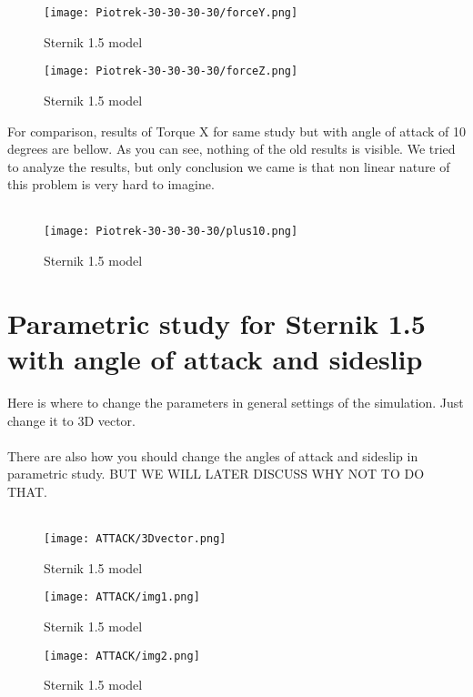 \begin{figure}[H]
    \centering
    \texttt{[image: Piotrek-30-30-30-30/forceY.png]}
    \caption{Sternik 1.5 model}
\end{figure}

\begin{figure}[H]
    \centering
    \texttt{[image: Piotrek-30-30-30-30/forceZ.png]}
    \caption{Sternik 1.5 model}
\end{figure}

For comparison, results of Torque X for same study but with angle of attack of 10 degrees are
bellow. As you can see, nothing of the old results is visible. We tried to analyze the results, but
only conclusion we came is that non linear nature of this problem is very hard to imagine. \\\\

\begin{figure}[H]
    \centering
    \texttt{[image: Piotrek-30-30-30-30/plus10.png]}
    \caption{Sternik 1.5 model}
\end{figure}


\newpage
\section{Parametric study for Sternik 1.5 with angle of attack and sideslip}
Here is where to change the parameters in general settings of the simulation. Just change it 
to 3D vector.\\\\
There are also how you should change the angles of attack and sideslip in parametric study. BUT 
WE WILL LATER DISCUSS WHY NOT TO DO THAT. \\\\

\begin{figure}[H]
    \centering
    \texttt{[image: ATTACK/3Dvector.png]}
    \caption{Sternik 1.5 model}
\end{figure}

\begin{figure}[H]
    \centering
    \texttt{[image: ATTACK/img1.png]}
    \caption{Sternik 1.5 model}
\end{figure}

\begin{figure}[H]
    \centering
    \texttt{[image: ATTACK/img2.png]}
    \caption{Sternik 1.5 model}
\end{figure}

